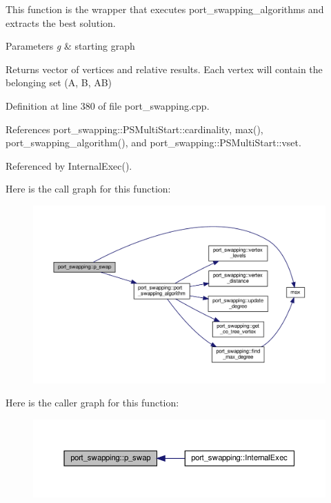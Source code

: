 This function is the wrapper that executes port\+\_\+swapping\+\_\+algorithms and extracts the best solution. 


\begin{DoxyParams}{Parameters}
{\em g} & starting graph \\
\hline
\end{DoxyParams}
\begin{DoxyReturn}{Returns}
vector of vertices and relative results. Each vertex will contain the belonging set (A, B, AB) 
\end{DoxyReturn}


Definition at line 380 of file port\+\_\+swapping.\+cpp.



References port\+\_\+swapping\+::\+P\+S\+Multi\+Start\+::cardinality, max(), port\+\_\+swapping\+\_\+algorithm(), and port\+\_\+swapping\+::\+P\+S\+Multi\+Start\+::vset.



Referenced by Internal\+Exec().

Here is the call graph for this function\+:
\nopagebreak
\begin{figure}[H]
\begin{center}
\leavevmode
\includegraphics[width=350pt]{d6/d83/classport__swapping_a9ea23faf1a55cdaa0ce699aa5f40086d_cgraph}
\end{center}
\end{figure}
Here is the caller graph for this function\+:
\nopagebreak
\begin{figure}[H]
\begin{center}
\leavevmode
\includegraphics[width=350pt]{d6/d83/classport__swapping_a9ea23faf1a55cdaa0ce699aa5f40086d_icgraph}
\end{center}
\end{figure}
\mbox{\label{classport__swapping_a0abef9594eed32fbbc61a0f798265145}} 
